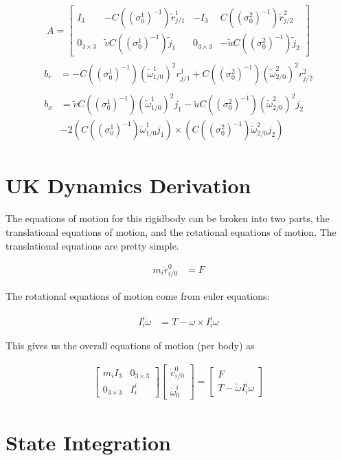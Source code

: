 \documentclass{article}
\begin{document}
\begin{align}
    A =
    \begin{bmatrix}
        I_3 & -C((\sigma_0^1)^{-1})\tilde{r}_{j/1}^1 & -I_3 &
        C((\sigma_0^2)^{-1})\tilde{r}_{j/2}^2 \\
        0_{3\times3} & \tilde{v}C((\sigma_0^1)^{-1})\tilde{j}_1 &
        0_{3\times3} & -\tilde{u}C((\sigma_0^2)^{-1})\tilde{j}_2
    \end{bmatrix}
\end{align}
\begin{align}
    \begin{split}
        b_r &=
        -C((\sigma_0^1)^{-1})(\tilde{\omega}_{1/0}^1)^2r_{j/1}^1 +
        C((\sigma_0^2)^{-1})(\tilde{\omega}_{2/0}^2)^2r_{j/2}^2
    \end{split} \\
    \begin{split}
        b_\sigma &= \tilde{v}C((\sigma_0^1)^{-1})(\tilde{\omega}_{1/0}^1)^2j_1 -
        \tilde{u}C((\sigma_0^2)^{-1})(\tilde{\omega}_{2/0}^2)^2j_2 \\
        &- 2(C((\sigma_0^1)^{-1})\tilde{\omega}_{1/0}^1j_1) \times
        (C((\sigma_0^2)^{-1})\tilde{\omega}_{2/0}^2j_2)
    \end{split}
\end{align}

\section{UK Dynamics Derivation}

The equations of motion for this rigidbody can be broken into two parts, the
translational equations of motion, and the rotational equations of motion.  The
translational equations are pretty simple.

\begin{align}
    m_i\ddot{r}_{i/0}^0 &= F
\end{align}

The rotational equations of motion come from euler equations:

\begin{align}
    I_i^i\dot{\omega} &= T - \omega\times I_i^i\omega
\end{align}

This gives us the overall equations of motion (per body) as

\begin{align}
    \begin{bmatrix}
        m_iI_3 & 0_{3 \times 3} \\
        0_{3 \times 3} & I_i^i
    \end{bmatrix}
    \begin{bmatrix}
        \dot{v}_{i/0}^0 \\
        \dot{\omega}_0^i
    \end{bmatrix} =
    \begin{bmatrix}
        F \\
        T - \tilde{\omega}I_i^i\omega
    \end{bmatrix}
\end{align}

\section{State Integration}
\end{document}
